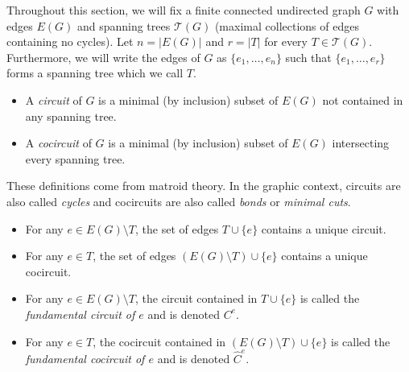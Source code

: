 \documentclass[ALCO,ThmDefs,Unicode,epreuves]{cedram}
\newcommand{\T}{\mathcal{T}}
\newcommand{\what}{\widehat}
\begin{document}
Throughout this section, we will fix a finite connected undirected graph $G$ with edges $E(G)$ and spanning trees $\T(G)$ (\ie maximal collections of edges containing no cycles). Let $n = |E(G)|$ and $r =|T|$ for every $T \in \T(G)$. Furthermore, we will write the edges of $G$ as $\{e_1,\dots,e_n\}$ such that $\{e_1,\dots,e_r\}$ forms a spanning tree which we call $T$. 
\begin{defi}\hfill
\begin{itemize}
 \item A \emph{circuit} of $G$ is a minimal (by inclusion) subset of $E(G)$ not contained in any spanning tree. 
 \item A \emph{cocircuit} of $G$ is a minimal (by inclusion) subset of $E(G)$ intersecting every spanning tree. 
\end{itemize}
These definitions come from matroid theory. In the graphic context, circuits are also called \emph{cycles} and cocircuits are also called \emph{bonds} or \emph{minimal cuts}. 
\end{defi}

\begin{lemma}\label{lem:funcirc}\hfill
\begin{itemize}
\item For any $e \in E(G) \setminus T$, the set of edges $T \cup \{e\}$ contains a unique circuit. 
\item For any $e \in T$, the set of edges $(E(G) \setminus T) \cup \{e\}$ contains a unique cocircuit. 
\end{itemize}
\end{lemma}

\begin{defi}\hfill
\begin{itemize}
\item For any $e \in E(G) \setminus T$, the circuit contained in $T \cup \{e\}$ is called the \emph{fundamental circuit of $e$} and is denoted $C^e$. 
\item For any $e \in T$, the cocircuit contained in $(E(G) \setminus T) \cup \{e\}$ is called the \emph{fundamental cocircuit of $e$} and is denoted $\what C^e$.
\end{itemize}
\end{defi}
\end{document}
